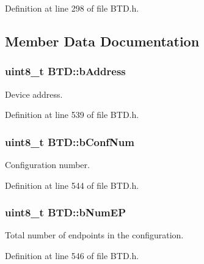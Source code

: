 \-Definition at line 298 of file \-B\-T\-D.\-h.



\subsection{\-Member \-Data \-Documentation}
\hypertarget{class_b_t_d_a58f78a9a28db81858dcc34a32a2ec82c}{
\subsubsection[{b\-Address}]{\setlength{\rightskip}{0pt plus 5cm}uint8\-\_\-t {\bf \-B\-T\-D\-::b\-Address}}}\label{class_b_t_d_a58f78a9a28db81858dcc34a32a2ec82c}
\-Device address. 

\-Definition at line 539 of file \-B\-T\-D.\-h.

\hypertarget{class_b_t_d_a10c34527ae90e95791ac48ac7d1154a2}{
\subsubsection[{b\-Conf\-Num}]{\setlength{\rightskip}{0pt plus 5cm}uint8\-\_\-t {\bf \-B\-T\-D\-::b\-Conf\-Num}}}\label{class_b_t_d_a10c34527ae90e95791ac48ac7d1154a2}
\-Configuration number. 

\-Definition at line 544 of file \-B\-T\-D.\-h.

\hypertarget{class_b_t_d_a893dd35932821cddda7e482a1904af66}{
\subsubsection[{b\-Num\-E\-P}]{\setlength{\rightskip}{0pt plus 5cm}uint8\-\_\-t {\bf \-B\-T\-D\-::b\-Num\-E\-P}}}\label{class_b_t_d_a893dd35932821cddda7e482a1904af66}
\-Total number of endpoints in the configuration. 

\-Definition at line 546 of file \-B\-T\-D.\-h.

